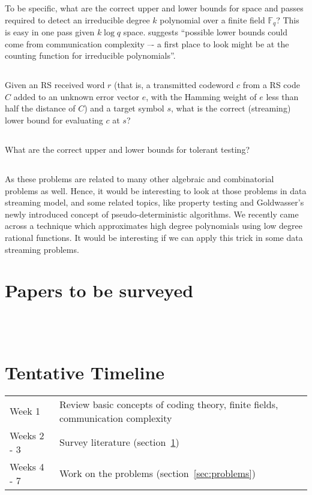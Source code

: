 \documentclass{article}
\begin{document}
To be specific, what are the correct upper and lower bounds for space and passes required to detect
an irreducible degree $k$ polynomial over a finite field $\mathbb{F}_q$?
This is easy in one pass given $k\log{q}$ space.
\citeauthor*{uurtamo-proposal}\cite{uurtamo-proposal} suggests
``possible lower bounds could come from communication complexity –-
a first place to look might be at the counting function for irreducible polynomials''.

\subsection{}
Given an RS received word $r$ (that is, a transmitted codeword $c$ from a RS code $C$ added to an unknown error vector $e$,
with the Hamming weight of $e$ less than half the distance of $C$) and a target symbol $s$,
what is the correct (streaming) lower bound for evaluating $c$ at $s$?\cite{uurtamo-proposal}

\subsection{}
What are the correct upper and lower bounds for tolerant testing?\cite{uurtamo-proposal}

\subsection{}
As these problems are related to many other algebraic and combinatorial problems as well. Hence,
it would be interesting to look at those problems in data streaming model, and some related topics,
like property testing and Goldwasser's newly introduced concept of pseudo-deterministic algorithms\cite{DBLP:journals/eccc/GoldreichGR12}.
We recently came across a technique which approximates high degree polynomials using low degree rational functions.
It would be interesting if we can apply this trick in some data streaming problems.

\section{Papers to be surveyed}
\label{sec:papers}
\citet*{rudra2010data}\\
\citet*{mcgregor2011polynomial}\\
\citet*{guruswami2005tolerant}

\section{Tentative Timeline}
\begin{tabular}{ l | p{6cm} }
  Week 1 & Review basic concepts of coding theory, finite fields, communication complexity \\
  Weeks 2 - 3 & Survey literature (section~\ref{sec:papers}) \\
  Weeks 4 - 7 & Work on the problems (section~\ref{sec:problems})
\end{tabular}



\end{document}
